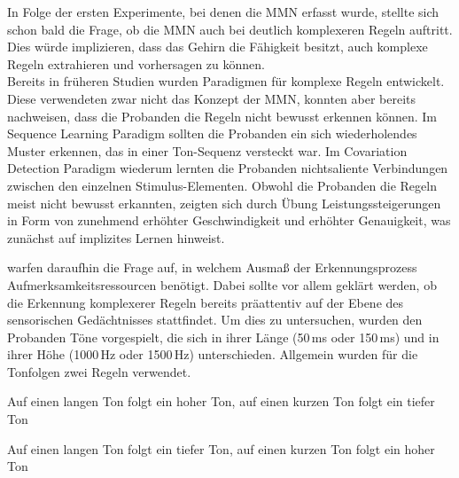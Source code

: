 \documentclass[doc,a4paper,12pt]{apa6}
\begin{document}
In Folge der ersten Experimente, bei denen die MMN erfasst wurde, stellte sich schon bald die Frage, ob die MMN auch bei deutlich komplexeren Regeln auftritt. Dies würde implizieren, dass das Gehirn die Fähigkeit besitzt, auch komplexe Regeln extrahieren und vorhersagen zu können.\\
Bereits in früheren Studien wurden Paradigmen für komplexe Regeln entwickelt. Diese verwendeten zwar nicht das Konzept der MMN, konnten aber bereits nachweisen, dass die Probanden die Regeln nicht bewusst erkennen können. Im Sequence Learning Paradigm \parencite{hoffmann1998implicit} sollten die Probanden ein sich wiederholendes Muster erkennen, das in einer Ton-Sequenz versteckt war. Im Covariation Detection Paradigm \parencite{stamov2001revealing} wiederum lernten die Probanden nichtsaliente Verbindungen zwischen den einzelnen Stimulus-Elementen. Obwohl die Probanden die Regeln meist nicht bewusst erkannten, zeigten sich durch Übung Leistungssteigerungen in Form von zunehmend erhöhter Geschwindigkeit und erhöhter Genauigkeit, was zunächst auf implizites Lernen hinweist.

\textcite{paavilainen2007preattentive} warfen daraufhin die Frage auf, in welchem Ausmaß der Erkennungsprozess Aufmerksamkeitsressourcen benötigt. Dabei sollte vor allem geklärt werden, ob die Erkennung komplexerer Regeln bereits präattentiv auf der Ebene des sensorischen Gedächtnisses stattfindet. Um dies zu untersuchen, wurden den Probanden Töne vorgespielt, die sich in ihrer Länge (50\,ms oder 150\,ms) und in ihrer Höhe (1000\,Hz oder 1500\,Hz) unterschieden. Allgemein wurden für die Tonfolgen zwei Regeln verwendet.

\begin{compactitem}
  \item Auf einen langen Ton folgt ein hoher Ton, auf einen kurzen Ton folgt ein tiefer
Ton
  \item Auf einen langen Ton folgt ein tiefer Ton, auf einen kurzen Ton folgt ein hoher
Ton
\end{compactitem}
\end{document}
